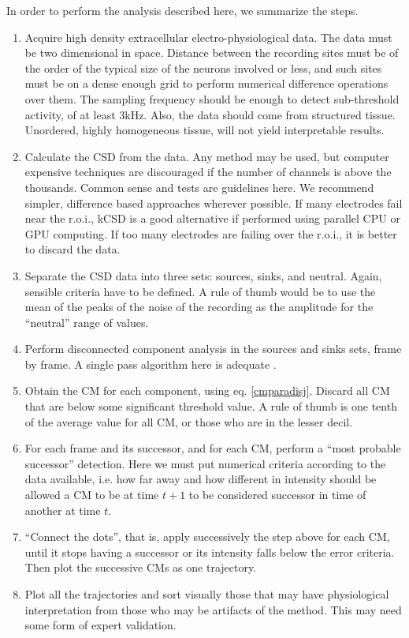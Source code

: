 \documentclass[utf8]{frontiersSCNS}
\begin{document}
 In order to perform the analysis described here, we summarize the steps.
 \begin{enumerate}
 \item Acquire high density extracellular electro-physiological data. The data must be two
   dimensional
   in space. Distance between the recording sites must be of the order of the typical
   size of the neurons involved or less, and such sites must be on a dense enough grid to perform numerical difference operations over them.
   The sampling frequency should be enough to detect sub-threshold activity,
   of at least 3kHz. Also, the data should come from structured tissue.
   Unordered, highly homogeneous tissue, will not yield interpretable results. 
 \item Calculate the CSD from the data. Any method may be used,
   but computer expensive techniques are discouraged if the
   number of channels is above the thousands.
   Common sense and tests are guidelines here.
   We recommend simpler, difference based approaches wherever possible.
   If many electrodes fail near the r.o.i.,
   kCSD is a good alternative if performed using
   parallel CPU or GPU computing.
   If too many electrodes are failing over the r.o.i.,
   it is better to discard the data. 
 \item Separate the CSD data into three sets: sources, sinks, and neutral.
   Again, sensible criteria have to be defined.
   A rule of thumb would be to use the mean of the peaks of the noise  of the recording as the amplitude for the ``neutral'' range of values. 
\item Perform disconnected component analysis in the sources and sinks sets, frame by frame.
  A single pass algorithm here is  adequate \citep{Vincent91, Abubaker07}.
\item  Obtain the CM for each component, using eq. \ref{cmparadisj}. Discard
  all CM that are below some significant threshold value. A rule of thumb is one tenth of the average value for all CM,
  or those who are in the lesser decil. 
\item For each frame and its successor, and for each CM, perform a ``most probable successor'' detection. Here we must put numerical criteria according to the data available, i.e. how far away and how different in intensity should be allowed a CM to be at time $t+1$ to be considered successor in time of another at time $t$.
\item ``Connect the dots'', that is, apply successively the step above for each CM, until it stops having a successor or its intensity falls below the error criteria. Then plot the successive CMs as one trajectory.
\item Plot all the trajectories and sort visually those that may have physiological interpretation from those who may be artifacts of the method. This may need some form of expert validation.
 \end{enumerate}
 
\end{document}

